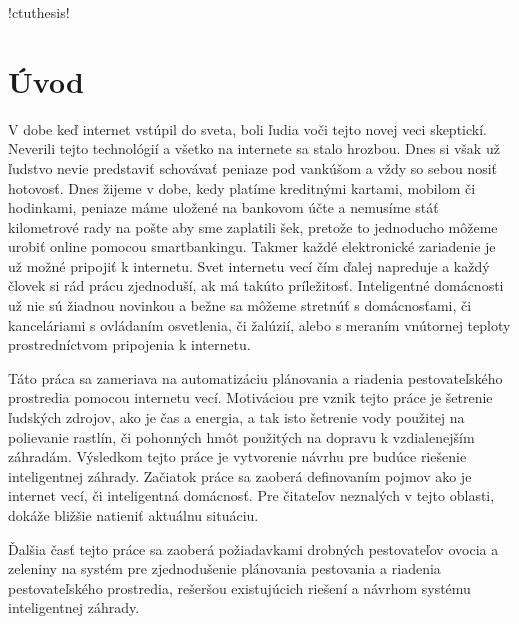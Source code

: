 \documentclass[twoside]{ctuthesis}
\theoremstyle{plain}
\theoremstyle{definition}
\theoremstyle{note}
\begin{document}
\renewcommand \ctulstsep {0pt}

\newcommand\ctuclsname{\leavevmode\unhcopy\ctuclsnamebox}
\newsavebox\ctuclsnamebox
\begin{lrbox}{\ctuclsnamebox}
\ctulst!ctuthesis!
\end{lrbox}

\maketitle
\chapter{Úvod}

V dobe keď internet vstúpil do sveta, boli ľudia voči tejto novej veci skeptickí. Neverili tejto technológií a všetko na internete sa stalo hrozbou. Dnes si však už ľudstvo nevie predstaviť schovávať peniaze pod vankúšom a vždy so sebou nosiť hotovosť. Dnes žijeme v dobe, kedy platíme kreditnými kartami, mobilom či hodinkami, peniaze máme uložené na bankovom účte a nemusíme stáť kilometrové rady na pošte aby sme zaplatili šek, pretože to jednoducho môžeme urobiť online pomocou smartbankingu. Takmer každé elektronické zariadenie je už možné pripojiť k internetu. Svet internetu vecí čím ďalej napreduje a každý človek si rád prácu zjednoduší, ak má takúto príležitosť. Inteligentné domácnosti už nie sú žiadnou novinkou a bežne sa môžeme stretnúť s domácnosťami, či kanceláriami s ovládaním osvetlenia, či žalúzií, alebo s meraním vnútornej teploty prostredníctvom pripojenia k internetu. 
\newline

Táto práca sa zameriava na automatizáciu plánovania a riadenia pestovateľského prostredia pomocou internetu vecí. Motiváciou pre vznik tejto práce je šetrenie ľudských zdrojov, ako je čas a energia, a tak isto šetrenie vody použitej na polievanie rastlín, či pohonných hmôt použitých na dopravu k vzdialenejším záhradám. Výsledkom tejto práce je vytvorenie návrhu pre budúce riešenie inteligentnej záhrady. Začiatok práce sa zaoberá definovaním pojmov ako je internet vecí, či inteligentná domácnosť. Pre čitateľov neznalých v tejto oblasti, dokáže bližšie natieniť aktuálnu situáciu. 
\newline

Ďalšia časť tejto práce sa zaoberá požiadavkami drobných pestovateľov ovocia a zeleniny na systém pre zjednodušenie plánovania pestovania a riadenia pestovateľského prostredia, rešeršou existujúcich riešení a návrhom systému inteligentnej záhrady.
\end{document}
